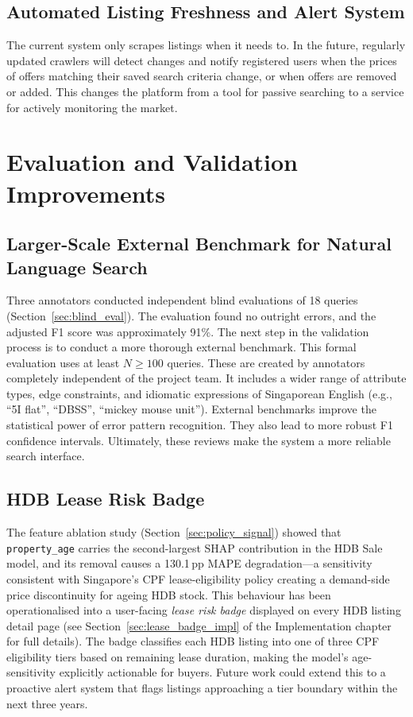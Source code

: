 \subsection{Automated Listing Freshness and Alert System}
The current system only scrapes listings when it needs to. In the future, regularly updated crawlers will detect changes and notify registered users when the prices of offers matching their saved search criteria change, or when offers are removed or added. This changes the platform from a tool for passive searching to a service for actively monitoring the market.

\section{Evaluation and Validation Improvements}

\subsection[Larger-Scale External Benchmark for NL Search]{Larger-Scale External Benchmark for Natural Language Search}
\label{sec:future_blind_eval}

Three annotators conducted independent blind evaluations of 18 queries (Section~\ref{sec:blind_eval}). 
The evaluation found no outright errors, and the adjusted F1 score was approximately 91\%. 
The next step in the validation process is to conduct a more thorough external benchmark. 
This formal evaluation uses at least $N \geq 100$ queries. These are created by annotators 
completely independent of the project team. It includes a wider range of attribute types, 
edge constraints, and idiomatic expressions of Singaporean English (e.g., ``5I flat'', 
``DBSS'', ``mickey mouse unit''). External benchmarks improve the statistical power of 
error pattern recognition. They also lead to more robust F1 confidence intervals. 
Ultimately, these reviews make the system a more reliable search interface.

\subsection{HDB Lease Risk Badge}
\label{sec:future_lease_badge}

The feature ablation study (Section~\ref{sec:policy_signal}) showed that
\texttt{property\_age} carries the second-largest SHAP contribution in the HDB Sale
model, and its removal causes a 130.1\,pp MAPE degradation---a sensitivity consistent
with Singapore's CPF lease-eligibility policy creating a demand-side price
discontinuity for ageing HDB stock. This behaviour has been operationalised into a
user-facing \textit{lease risk badge} displayed on every HDB listing detail page (see
Section~\ref{sec:lease_badge_impl} of the Implementation chapter for full details).
The badge classifies each HDB listing into one of three CPF eligibility tiers based on
remaining lease duration, making the model's age-sensitivity explicitly actionable for buyers.
Future work could extend this to a proactive alert system that flags listings approaching
a tier boundary within the next three years.

